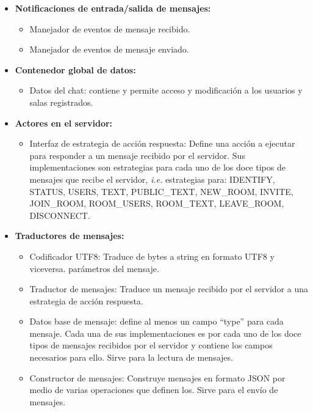 \begin{itemize}
\begin{itemize}
		\item Manejador de la conexión con el cliente: maneja la conexión y desconexión segura de un cliente dado.
	\end{itemize}
	\item \textbf{Notificaciones de entrada/salida de mensajes:}
	\begin{itemize}
		\item Manejador de eventos de mensaje recibido.
		\item Manejador de eventos de mensaje enviado.
	\end{itemize}
	\item \textbf{Contenedor global de datos:}
	\begin{itemize}
		\item Datos del chat: contiene y permite acceso y modificación a los usuarios y salas registrados.
	\end{itemize}
	\item \textbf{Actores en el servidor:}
	\begin{itemize}
		\item Interfaz de estrategia de acción respuesta: Define una acción a ejecutar para responder a un mensaje recibido por el servidor. Sus implementaciones son estrategias para cada uno de los doce tipos de mensajes que recibe el servidor, \textit{i.e.} estrategias para: IDENTIFY, STATUS, USERS, TEXT, PUBLIC\_TEXT, NEW\_ROOM, INVITE, JOIN\_ROOM, ROOM\_USERS, ROOM\_TEXT, LEAVE\_ROOM, DISCONNECT.
	\end{itemize}
	\item \textbf{Traductores de mensajes:}
	\begin{itemize}
		\item Codificador UTF8: Traduce de bytes a string en formato UTF8 y viceversa. parámetros del mensaje.
		\item Traductor de mensajes: Traduce un mensaje recibido por el servidor a una estrategia de acción respuesta.
		\item Datos base de mensaje: define al menos un campo ``type'' para cada mensaje. Cada una de sus implementaciones es por cada uno de los doce tipos de mensajes recibidos por el servidor y contiene los campos necesarios para ello. Sirve para la lectura de mensajes.
		\item Constructor de mensajes: Construye mensajes en formato JSON por medio de varias operaciones que definen los. Sirve para el envío de mensajes.
	\end{itemize}

\end{itemize}

